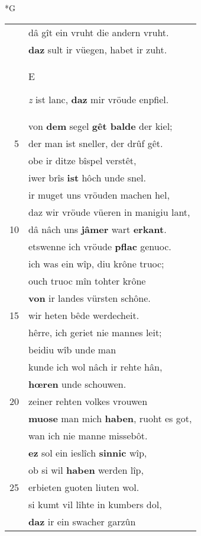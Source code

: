 \documentclass[8pt,a4paper,notitlepage]{article}
\begin{document}
\begin{table}[ht]
\begin{minipage}[t]{0.5\linewidth}
\small
\begin{center}*G
\end{center}
\begin{tabular}{rl}
 & dâ gît ein vruht die andern vruht.\\ 
 & \textbf{daz} sult ir vüegen, habet ir zuht.\\ 
 & \begin{large}E\end{large}\textit{z} ist lanc, \textbf{daz} mir vröude enpfiel.\\ 
 & von \textbf{dem} segel \textbf{gêt balde} der kiel;\\ 
5 & der man ist sneller, der drûf gêt.\\ 
 & obe ir ditze bîspel verstêt,\\ 
 & iwer brîs \textbf{ist} hôch unde snel.\\ 
 & ir muget uns vröuden machen hel,\\ 
 & daz wir vröude vüeren in manigiu lant,\\ 
10 & dâ nâch uns \textbf{jâmer} wart \textbf{erkant}.\\ 
 & etswenne ich vröude \textbf{pflac} genuoc.\\ 
 & ich was ein wîp, diu krône truoc;\\ 
 & ouch truoc mîn tohter krône\\ 
 & \textbf{von} ir landes vürsten schône.\\ 
15 & wir heten bêde werdecheit.\\ 
 & hêrre, ich geriet nie mannes leit;\\ 
 & beidiu wîb unde man\\ 
 & kunde ich wol nâch ir rehte hân,\\ 
 & \textbf{hœren} unde schouwen.\\ 
20 & zeiner rehten volkes vrouwen\\ 
 & \textbf{muose} man mich \textbf{haben}, ruoht es got,\\ 
 & wan ich nie manne missebôt.\\ 
 & \textbf{ez} sol ein ieslîch \textbf{sinnic} wîp,\\ 
 & ob si wil \textbf{haben} werden lîp,\\ 
25 & erbieten guoten liuten wol.\\ 
 & si kumt vil lîhte in kumbers dol,\\ 
 & \textbf{daz} ir ein swacher garzûn\\ 

\end{tabular}
\end{minipage}
\end{table}
\end{document}
